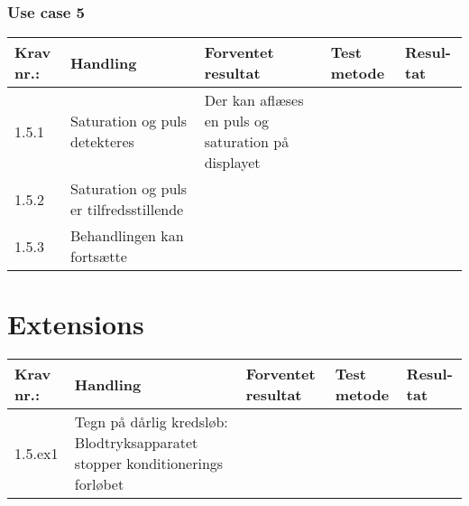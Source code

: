 \documentclass[11pt]{article}
\begin{document}
					\subsection{Use case 5}
					\begin{center}
						\begin{longtable}{|p{1.5cm}|p{2cm}|p{3cm}|p{3cm}|p{1.1cm}|}
							\hline
							Krav nr.: & Handling & Forventet resultat & Test metode & Resul-tat  \\\hline
							1.5.1 & Saturation og puls detekteres & Der kan aflæses en puls og saturation på displayet& & \\ \hline
							1.5.2 & Saturation og puls er tilfredsstillende & & & \\ \hline
							1.5.3 & Behandlingen kan fortsætte & & & \\ \hline
							\end{longtable}
					\end{center}
					
					\chapter{Extensions}
					\begin{center}
						\begin{longtable}{|p{1.5cm}|p{2cm}|p{3cm}|p{3cm}|p{1.1cm}|}
							\hline
							Krav nr.: & Handling & Forventet resultat & Test metode & Resul-tat  \\\hline
							1.5.ex1 & Tegn på dårlig kredsløb: Blodtryksapparatet stopper konditionerings forløbet & & & \\ \hline
						\end{longtable}
				\end{center}
				
\end{document}
